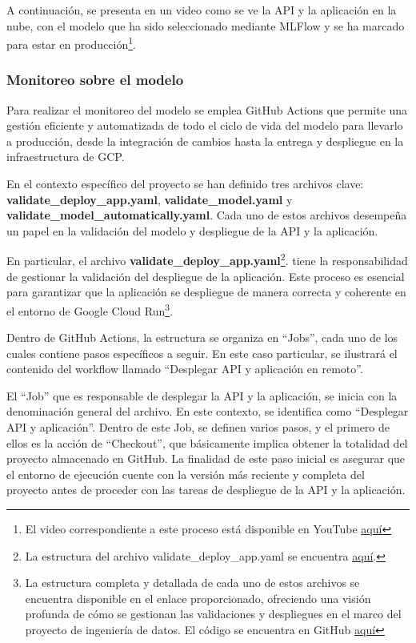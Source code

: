 A continuación, se presenta en un video como se ve la API y la aplicación en la nube, con el modelo que ha sido seleccionado mediante MLFlow y se ha marcado para estar en producción\footnote{El video correspondiente a este proceso está disponible en YouTube \href{https://youtu.be/GV5-WZFxAOU?si=juse0Gmu4mX00cAJ}{aquí}}.

\newpage

\subsubsection{Monitoreo sobre el modelo}

Para realizar el monitoreo del modelo se emplea GitHub Actions que permite una gestión eficiente y automatizada de todo el ciclo de vida del modelo para llevarlo a producción, desde la integración de cambios hasta la entrega y despliegue en la infraestructura de GCP.

En el contexto específico del proyecto se han definido tres archivos clave: \\ \textbf{validate\_deploy\_app.yaml}, \textbf{validate\_model.yaml} y \textbf{validate\_model\_automatically.yaml}. Cada uno de estos archivos desempeña un papel en la validación del modelo y despliegue de la API y la aplicación. 

En particular, el archivo \textbf{validate\_deploy\_app.yaml}\footnote{La estructura del archivo validate\_deploy\_app.yaml se encuentra \href{https://github.com/juferoto/mlops_project/blob/master/.github/workflows/validate_deploy_app.yaml}{aquí}.}. tiene la responsabilidad de gestionar la validación del despliegue de la aplicación. Este proceso es esencial para garantizar que la aplicación se despliegue de manera correcta y coherente en el entorno de Google Cloud Run\footnote{La estructura completa y detallada de cada uno de estos archivos se encuentra disponible en el enlace proporcionado, ofreciendo una visión profunda de cómo se gestionan las validaciones y despliegues en el marco del proyecto de ingeniería de datos. El código se encuentra en GitHub \href{https://github.com/juferoto/mlops_project/tree/master/.github/workflows}{aquí}}.

Dentro de GitHub Actions, la estructura se organiza en ``Jobs'', cada uno de los cuales contiene pasos específicos a seguir. En este caso particular, se ilustrará el contenido del workflow llamado ``Desplegar API y aplicación en remoto''.

El ``Job'' que es responsable de desplegar la API y la aplicación, se inicia con la denominación general del archivo. En este contexto, se identifica como ``Desplegar API y aplicación''. Dentro de este Job, se definen varios pasos, y el primero de ellos es la acción de ``Checkout'', que básicamente implica obtener la totalidad del proyecto almacenado en GitHub. La finalidad de este paso inicial es asegurar que el entorno de ejecución cuente con la versión más reciente y completa del proyecto antes de proceder con las tareas de despliegue de la API y la aplicación.

